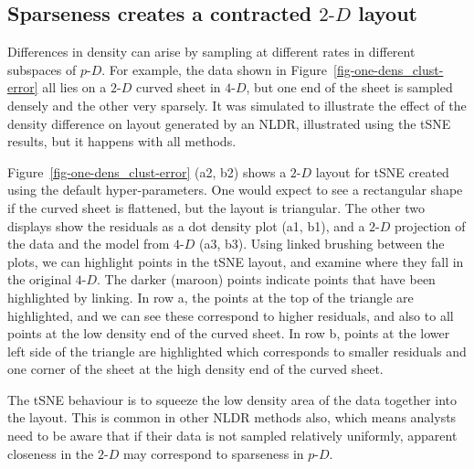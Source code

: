 \documentclass[
  11pt,
  a4paper,
]{report}
\newcommand\pD{$p\text{-}D$}
\newcommand\gD{$2\text{-}D$}
\newcommand\fD{$4\text{-}D$}
\begin{document}
\subsection{\texorpdfstring{Sparseness creates a contracted \gD{}
layout}{Sparseness creates a contracted  layout}}\label{sec-effect-dens}

Differences in density can arise by sampling at different rates in
different subspaces of \pD{}. For example, the data shown in
Figure~\ref{fig-one-dens_clust-error} all lies on a \gD{} curved sheet
in \fD{}, but one end of the sheet is sampled densely and the other very
sparsely. It was simulated to illustrate the effect of the density
difference on layout generated by an NLDR, illustrated using the tSNE
results, but it happens with all methods.

Figure~\ref{fig-one-dens_clust-error} (a2, b2) shows a \gD{} layout for
tSNE created using the default hyper-parameters. One would expect to see
a rectangular shape if the curved sheet is flattened, but the layout is
triangular. The other two displays show the residuals as a dot density
plot (a1, b1), and a \gD{} projection of the data and the model from
\fD{} (a3, b3). Using linked brushing between the plots, we can
highlight points in the tSNE layout, and examine where they fall in the
original \fD{}. The darker (maroon) points indicate points that have
been highlighted by linking. In row a, the points at the top of the
triangle are highlighted, and we can see these correspond to higher
residuals, and also to all points at the low density end of the curved
sheet. In row b, points at the lower left side of the triangle are
highlighted which corresponds to smaller residuals and one corner of the
sheet at the high density end of the curved sheet.

The tSNE behaviour is to squeeze the low density area of the data
together into the layout. This is common in other NLDR methods also,
which means analysts need to be aware that if their data is not sampled
relatively uniformly, apparent closeness in the \gD{} may correspond to
sparseness in \pD{}.
\end{document}
